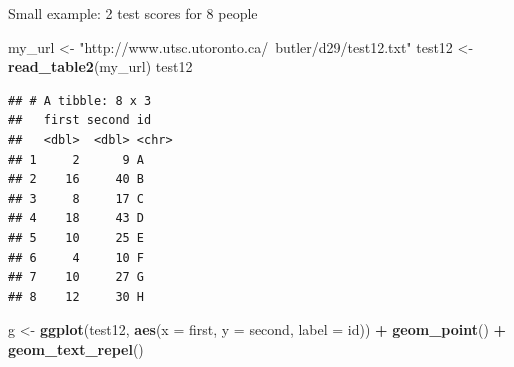 \documentclass[ignorenonframetext,]{beamer}
\newenvironment{Shaded}{\begin{snugshade}}{\end{snugshade}}
\newcommand{\DataTypeTok}[1]{\textcolor[rgb]{0.13,0.29,0.53}{#1}}
\newcommand{\KeywordTok}[1]{\textcolor[rgb]{0.13,0.29,0.53}{\textbf{#1}}}
\newcommand{\NormalTok}[1]{#1}
\newcommand{\OperatorTok}[1]{\textcolor[rgb]{0.81,0.36,0.00}{\textbf{#1}}}
\newcommand{\StringTok}[1]{\textcolor[rgb]{0.31,0.60,0.02}{#1}}
\begin{document}
\begin{frame}[fragile]{Small example: 2 test scores for 8 people}
\protect\hypertarget{small-example-2-test-scores-for-8-people}{}

\begin{Shaded}
\begin{Highlighting}[]
\NormalTok{my_url <-}\StringTok{ "http://www.utsc.utoronto.ca/~butler/d29/test12.txt"}
\NormalTok{test12 <-}\StringTok{ }\KeywordTok{read_table2}\NormalTok{(my_url)}
\NormalTok{test12}
\end{Highlighting}
\end{Shaded}

\begin{verbatim}
## # A tibble: 8 x 3
##   first second id   
##   <dbl>  <dbl> <chr>
## 1     2      9 A    
## 2    16     40 B    
## 3     8     17 C    
## 4    18     43 D    
## 5    10     25 E    
## 6     4     10 F    
## 7    10     27 G    
## 8    12     30 H
\end{verbatim}

\begin{Shaded}
\begin{Highlighting}[]
\NormalTok{g <-}\StringTok{ }\KeywordTok{ggplot}\NormalTok{(test12, }\KeywordTok{aes}\NormalTok{(}\DataTypeTok{x =}\NormalTok{ first, }\DataTypeTok{y =}\NormalTok{ second, }\DataTypeTok{label =}\NormalTok{ id)) }\OperatorTok{+}
\StringTok{  }\KeywordTok{geom_point}\NormalTok{() }\OperatorTok{+}\StringTok{ }\KeywordTok{geom_text_repel}\NormalTok{()}
\end{Highlighting}
\end{Shaded}

\end{frame}
\end{document}
